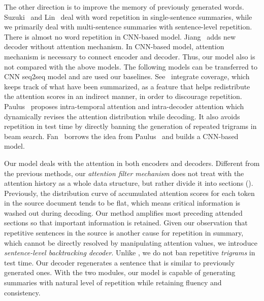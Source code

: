 The other direction is to improve the memory of previously generated words.
Suzuki~ and Lin~ 
deal with word repetition in single-sentence summaries, 
while we primarily deal with multi-sentence summaries with 
sentence-level repetition. 
There is almost no word repetition in CNN-based model.
Jiang~ adds new decoder without attention mechanism.
In CNN-based model, attention mechanism is necessary to connect encoder 
and decoder.
Thus, our model also is not compared with the above models. 
The following models can be transferred to CNN seq2seq model and
are used our baselines.
See~ integrate coverage, 
which keeps track of what have been summarized, as a feature that helps 
redistribute the attention scores in an indirect manner,
in order to discourage repetition. 
Paulus~ proposes intra-temporal attention and 
intra-decoder attention which dynamically revises the attention distribution while decoding. 
It also avoids repetition in test time by directly banning the generation of 
repeated trigrams in beam search. 
Fan~ borrows the idea from Paulus~ and builds a CNN-based model. 

Our model deals with the attention in both encoders and decoders. 
Different from the previous methods, 
our \textit{attention filter mechanism} does not 
treat with the attention history as a whole data structure,  
but rather divide it into sections (). 
Previously, the distribution curve of accumulated attention scores 
for each token in the source document tends to be flat, which means critical information is washed out during decoding.
Our method amplifies most preceding attended sections so that 
important information is retained.
Given our observation that repetitive sentences in the source is 
another cause for repetition in summary, 
which cannot be directly resolved by manipulating attention values, 
we introduce \textit{sentence-level backtracking decoder}. 
Unlike \cite{PaulusXS17}, 
we do not ban repetitive \textit{trigrams} in test time. 
Our decoder regenerates a sentence that is similar to previously generated ones.
With the two modules, our model is capable of generating summaries with
natural level of repetition while retaining fluency and consistency.
